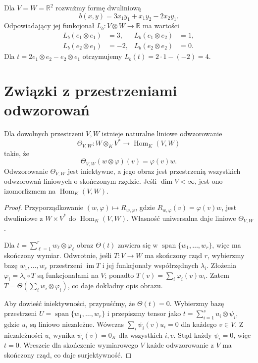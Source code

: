 \begin{przyklad}
\label{prz:lin9-forma}
Dla \(V=W=\mathbb R^2\)
rozważmy formę dwuliniową
\[
 b(x,y)=3x_1y_1+x_1y_2-2x_2y_1.
\]
Odpowiadający jej funkcjonał
\(L_b\colon V\otimes W\to\mathbb R\)
ma wartości
\[
 \begin{aligned}
 L_b(e_1\otimes e_1)&=3,&
 L_b(e_1\otimes e_2)&=1,\\
 L_b(e_2\otimes e_1)&=-2,&
 L_b(e_2\otimes e_2)&=0.
 \end{aligned}
\]
Dla
\(t=2e_1\otimes e_2-e_2\otimes e_1\)
otrzymujemy
\(L_b(t)=2\cdot1-(-2)=4\).
\end{przyklad}

\section{Związki z przestrzeniami odwzorowań}
\label{sec:lin9-hom}

\begin{twierdzenie}
\label{thm:lin9-hom-rzad}
Dla dowolnych przestrzeni \(V,W\)
istnieje naturalne liniowe
odwzorowanie
\[
 \Theta_{V,W}\colon
 W\otimes_KV^*\to\operatorname{Hom}_K(V,W)
\]
takie, że
\[
 \Theta_{V,W}(w\otimes\varphi)(v)
 =\varphi(v)w.
\]
Odwzorowanie \(\Theta_{V,W}\)
jest iniektywne, a jego obraz
jest przestrzenią wszystkich
odwzorowań liniowych o skończonym
rzędzie. Jeśli \(\dim V<\infty\),
jest ono izomorfizmem na
\(\operatorname{Hom}_K(V,W)\).
\end{twierdzenie}
\begin{proof}
Przyporządkowanie
\((w,\varphi)\mapsto R_{w,\varphi}\),
gdzie
\(R_{w,\varphi}(v)=\varphi(v)w\),
jest dwuliniowe z \(W\times V^*\)
do \(\operatorname{Hom}_K(V,W)\).
Własność uniwersalna
daje liniowe \(\Theta_{V,W}\).

Dla
\(t=\sum_{\ell=1}^r
w_\ell\otimes\varphi_\ell\)
obraz \(\Theta(t)\)
zawiera się w
\(\operatorname{span}\{w_1,\ldots,w_r\}\),
więc ma skończony wymiar.
Odwrotnie, jeśli \(T\colon V\to W\)
ma skończony rząd \(r\),
wybierzmy bazę
\(w_1,\ldots,w_r\)
przestrzeni \(\operatorname{im}T\)
i jej funkcjonały współrzędnych
\(\lambda_i\).
Złożenia \(\varphi_i=\lambda_i\circ T\)
są funkcjonałami na \(V\);
ponadto \(T(v)=\sum_i\varphi_i(v)w_i\).
Zatem
\(T=\Theta(\sum_iw_i\otimes\varphi_i)\),
co daje dokładny opis obrazu.

Aby dowieść iniektywności,
przypuśćmy, że \(\Theta(t)=0\).
Wybierzmy bazę przestrzeni
\(U=\operatorname{span}\{w_1,\ldots,w_r\}\)
i przepiszmy tensor jako
\(t=\sum_{i=1}^s u_i\otimes\psi_i\),
gdzie \(u_i\) są liniowo niezależne.
Wówczas
\(\sum_i\psi_i(v)u_i=0\)
dla każdego \(v\in V\).
Z niezależności \(u_i\)
wynika \(\psi_i(v)=0_K\)
dla wszystkich \(i,v\).
Stąd każdy \(\psi_i=0\),
więc \(t=0\).
Wreszcie dla skończenie
wymiarowego \(V\) każde
odwzorowanie z \(V\)
ma skończony rząd,
co daje surjektywność.
\end{proof}

